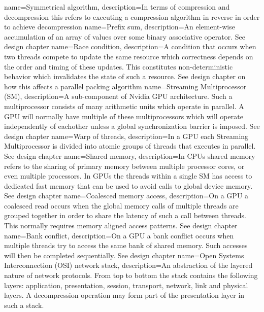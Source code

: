  {
  name={Symmetrical algorithm},
  description={In terms of compression and decompression this refers to executing a compression algorithm in reverse in order to achieve decompression}
 }
 {
  name={Prefix sum},
  description={An element-wise accumulation of an array of values over some binary associative operator. See design chapter}
 }
 {
  name={Race condition},
  description={A condition that occurs when two threads compete to update the same resource which correctness depends on the order and timing of these updates. This 
  constitutes non-deterministic behavior which invalidates the state of such a resource. See design chapter on how this affects a parallel packing algorithm}
 }
 {
  name={Streaming Multiprocessor (SM)},
  description={A sub-component of Nvidia GPU architecture. Such a multiprocessor consists of many arithmetic units which operate in parallel. A GPU will normally have
  multiple of these multiprocessors which will operate independently of eachother unless a global synchronization barrier is imposed. See design chapter}
 }
 {
  name={Warp of threads},
  description={In a GPU each Streaming Multiprocessor is divided into atomic groups of threads that executes in parallel. See design chapter}
 }
 {
  name={Shared memory},
  description={In CPUs shared memory refers to the sharing of primary memory between multiple processor cores, or even multiple processors. In GPUs the threads within
  a single SM has access to dedicated fast memory that can be used to avoid calls to global device memory. See design chapter}
 }
 {
  name={Coalesced memory access},
  description={On a GPU a coalesced read occurs when the global memory calls of multiple threads are grouped together in order to share the latency of such a call
  between threads. This normally requires memory aligned access patterns. See design chapter}
 }
 {
  name={Bank conflict},
  description={On a GPU a bank conflict occurs when multiple threads try to access the same bank of shared memory. Such accesses will then be completed sequentially.
  See design chapter}
 }
 {
  name={Open Systems Interconnection (OSI) network stack},
  description={An abstraction of the layered nature of network protocols. From top to bottom the stack contains the following layers: application, presentation, session,
  transport, network, link and physical layers. A decompression operation may form part of the presentation layer in such a stack.}
 }
